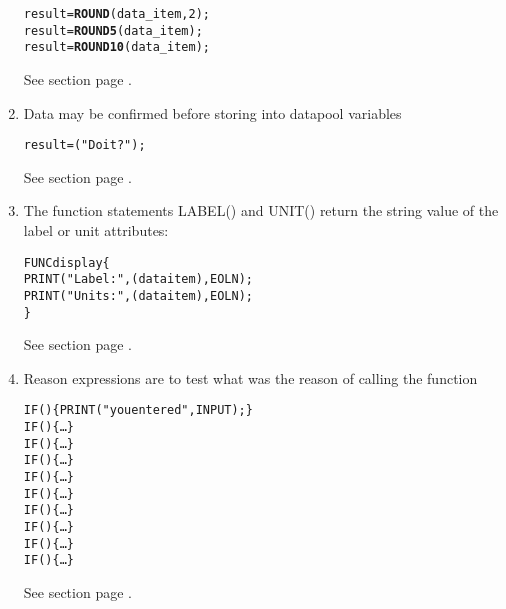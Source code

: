 \begin{enumerate}
\begin{boxedminipage}[t]{\linewidth}
\begin{alltt}
  result = {\bfseries ROUND}( data_item, 2 );
  result = {\bfseries ROUND5}( data_item );
  result = {\bfseries ROUND10}( data_item );
\end{alltt}
\end{boxedminipage}

See section  page \pageref{fuexpressionsfunctions}. \\
\item Data may be confirmed before storing into datapool variables

\begin{boxedminipage}[t]{\linewidth}
\begin{alltt}
  result = \CONFIRM( "Do it?" );
\end{alltt}
\end{boxedminipage}

See section  page \pageref{fuexpressionsfunctions}. \\
\item The function statements LABEL() and UNIT()
 return the string value of the label or unit
 attributes:

\begin{boxedminipage}[t]{\linewidth}
\begin{alltt}
  FUNC display \{
    PRINT ( "Label: ", \LABEL( dataitem ), EOLN );
    PRINT ( "Units: ", \UNIT( dataitem ), EOLN );
  \}
\end{alltt}
\end{boxedminipage}

See section  page 
  \pageref{fuexpressionsfunctions}.

\item Reason expressions are to test what was the reason of calling the function

\begin{boxedminipage}[t]{\linewidth}
\begin{alltt}
  IF (\REASONINPUT) \{ PRINT ("you entered ", INPUT); \}
  IF (\REASONINSERT) \{ \ldots \}
  IF (\REASONDUPLICATE) \{ \ldots \}
  IF (\REASONCLEAR) \{ \ldots \}
  IF (\REASONREMOVE) \{ \ldots \}
  IF (\REASONPACK) \{ \ldots \}
  IF (\REASONSELECT) \{ \ldots \}
  IF (\REASONUNSELECT) \{ \ldots \}
  IF (\REASONACTIVATE) \{ \ldots \}
  IF (\REASONDROP) \{ \ldots \}
\end{alltt}
\end{boxedminipage}

See section  page \pageref{fuexpressionsreason}. \\
\end{enumerate}

